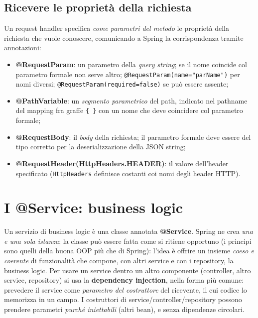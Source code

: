 \subsection{Ricevere le propriet\`a della richiesta}
Un request handler specifica \emph{come parametri del metodo} le propriet\`a della richiesta
che vuole conoscere, comunicando a Spring la corrispondenza tramite annotazioni:
\begin{itemize}
  \item \textbf{@RequestParam}: un parametro della \emph{query string}; se il nome coincide
        col parametro formale non serve altro; \texttt{@RequestParam(name="parName")} per
        nomi diversi; \texttt{@RequestParam(required=false)} se pu\`o essere assente;
  \item \textbf{@PathVariable}: un \emph{segmento parametrico} del path, indicato nel
        pathname del mapping fra graffe \texttt{\{ \}} con un nome che deve coincidere col
        parametro formale;
  \item \textbf{@RequestBody}: il \emph{body} della richiesta; il parametro formale deve
        essere del tipo corretto per la deserializzazione della JSON string;
  \item \textbf{@RequestHeader(HttpHeaders.HEADER)}: il valore dell'header specificato
        (\texttt{HttpHeaders} definisce costanti coi nomi degli header HTTP).
\end{itemize}

\section{I @Service: business logic}

Un servizio di business logic \`e una classe annotata \textbf{@Service}. Spring ne crea
\emph{una e una sola istanza}; la classe pu\`o essere fatta come si ritiene opportuno (i
principi sono quelli della buona OOP pi\`u che di Spring): l'idea \`e offrire un insieme
\emph{coeso e coerente} di funzionalit\`a che compone, con altri service e con i repository,
la business logic. Per usare un service dentro un altro componente (controller, altro
service, repository) si usa la \textbf{dependency injection}, nella forma pi\`u comune:
prevedere il service come \emph{parametro del costruttore} del ricevente, il cui codice lo
memorizza in un campo. I costruttori di service/controller/repository possono prendere
parametri \emph{purch\'e iniettabili} (altri bean), e senza dipendenze circolari.

